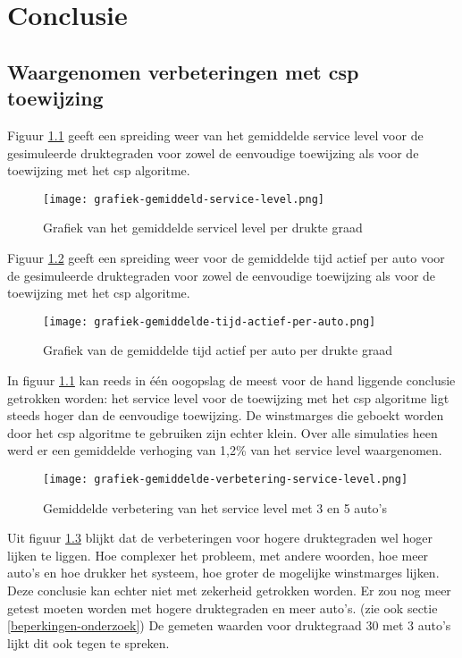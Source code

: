 
\chapter{Conclusie}
\label{ch:conclusie}

\section{Waargenomen verbeteringen met csp toewijzing}
Figuur \ref{grafiek:gemiddeld-service-level} geeft een spreiding weer van het gemiddelde service level voor de gesimuleerde druktegraden voor zowel de eenvoudige toewijzing als voor de toewijzing met het csp algoritme. 
\begin{figure}[h]
	\texttt{[image: grafiek-gemiddeld-service-level.png]}
	\caption[Gemiddeld service level]{Grafiek van het gemiddelde servicel level per drukte graad}
	\label{grafiek:gemiddeld-service-level}
\end{figure}
Figuur \ref{grafiek:gemiddelde-tijd-actief-per-auto} geeft een spreiding weer voor de gemiddelde tijd actief per auto voor de gesimuleerde druktegraden voor zowel de eenvoudige toewijzing als voor de toewijzing met het csp algoritme.
\begin{figure}[h]
	\texttt{[image: grafiek-gemiddelde-tijd-actief-per-auto.png]}
	\caption[Gemiddelde tijd actief per auto]{Grafiek van de gemiddelde tijd actief per auto per drukte graad}
	\label{grafiek:gemiddelde-tijd-actief-per-auto}
\end{figure}
In figuur \ref{grafiek:gemiddeld-service-level} kan reeds in één oogopslag de meest voor de hand liggende conclusie getrokken worden: het service level voor de toewijzing met het csp algoritme ligt steeds hoger dan de eenvoudige toewijzing. De winstmarges die geboekt worden door het csp algoritme te gebruiken zijn echter klein. Over alle simulaties heen werd er een gemiddelde verhoging van 1,2\% van het service level waargenomen. 
\begin{figure}[h]
	\texttt{[image: grafiek-gemiddelde-verbetering-service-level.png]}
	\caption[Verbetering service level]{Gemiddelde verbetering van het service level met 3 en 5 auto's}
	\label{grafiek:gemiddelde-verbetering-service-level}
\end{figure}
Uit figuur \ref{grafiek:gemiddelde-verbetering-service-level} blijkt dat de verbeteringen voor hogere druktegraden wel hoger lijken te liggen. Hoe complexer het probleem, met andere woorden, hoe meer auto's en hoe drukker het systeem, hoe groter de mogelijke winstmarges lijken. Deze conclusie kan echter niet met zekerheid getrokken worden. Er zou nog meer getest moeten worden met hogere druktegraden en meer auto's. (zie ook sectie \ref{beperkingen-onderzoek}) De gemeten waarden voor druktegraad 30 met 3 auto's lijkt dit ook tegen te spreken.
